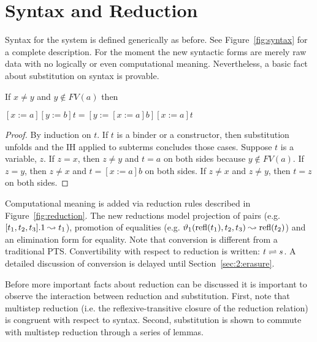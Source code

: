 \section{Syntax and Reduction}




Syntax for the system is defined generically as before.
See Figure~\ref{fig:syntax} for a complete description.
For the moment the new syntactic forms are merely raw data with no logically or even computational meaning.
Nevertheless, a basic fact about substitution on syntax is provable.

\begin{lemma}
    If $x \neq y$ and $y \notin FV(a)$ then \begin{tightcenter} $[x := a][y := b]t = [y := [x := a]b][x := a]t$ \end{tightcenter}
    \label{lem:2:subst_commute}
\end{lemma}
\begin{proof}
    By induction on $t$.
    If $t$ is a binder or a constructor, then substitution unfolds and the IH applied to subterms concludes those cases.
    Suppose $t$ is a variable, $z$.
    If $z = x$, then $z \neq y$ and $t = a$ on both sides because $y \notin FV(a)$.
    If $z = y$, then $z \neq x$ and $t = [x := a]b$ on both sides.
    If $z \neq x$ and $z \neq y$, then $t = z$ on both sides.
\end{proof}

Computational meaning is added via reduction rules described in Figure~\ref{fig:reduction}.
The new reductions model projection of pairs (e.g. $[t_1, t_2, t_3].1 \leadsto t_1$), promotion of equalities (e.g. $\vartheta_1(\text{refl}(t_1), t_2, t_3) \leadsto \text{refl}(t_2)$) and an elimination form for equality.
Note that conversion is different from a traditional PTS.
Convertibility with respect to reduction is written: $t \rightleftharpoons s$.
A detailed discussion of conversion is delayed until Section~\ref{sec:2:erasure}.

Before more important facts about reduction can be discussed it is important to observe the interaction between reduction and substitution.
First, note that multistep reduction (i.e. the reflexive-transitive closure of the reduction relation) is congruent with respect to syntax.
Second, substitution is shown to commute with multistep reduction through a series of lemmas.

